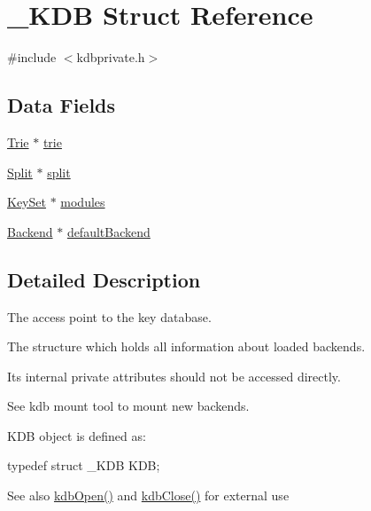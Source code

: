 \hypertarget{struct__KDB}{
\section{\_\-KDB Struct Reference}
\label{struct__KDB}
}


{\ttfamily \#include $<$kdbprivate.h$>$}

\subsection*{Data Fields}
\begin{DoxyCompactItemize}
\item 
\hyperlink{struct__Trie}{Trie} $\ast$ \hyperlink{struct__KDB_afbad422f11b1a72aaf6dc8909d60da17}{trie}
\item 
\hyperlink{struct__Split}{Split} $\ast$ \hyperlink{struct__KDB_ae301239675a86338980067c82c5134a9}{split}
\item 
\hyperlink{struct__KeySet}{KeySet} $\ast$ \hyperlink{struct__KDB_a1ecf6a6a2a46222f243bbfc4c97015c6}{modules}
\item 
\hyperlink{struct__Backend}{Backend} $\ast$ \hyperlink{struct__KDB_a93951ad0fd6e131da9bb1035d5a69c13}{defaultBackend}
\end{DoxyCompactItemize}


\subsection{Detailed Description}
The access point to the key database.

The structure which holds all information about loaded backends.

Its internal private attributes should not be accessed directly.

See kdb mount tool to mount new backends.

KDB object is defined as: 
\begin{DoxyCode}
typedef struct _KDB KDB;
\end{DoxyCode}


\begin{DoxySeeAlso}{See also}
\hyperlink{group__kdb_ga6808defe5870f328dd17910aacbdc6ca}{kdbOpen()} and \hyperlink{group__kdb_gadb54dc9fda17ee07deb9444df745c96f}{kdbClose()} for external use 
\end{DoxySeeAlso}


